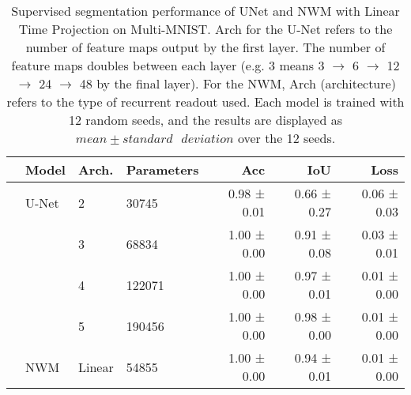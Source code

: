 \begin{table*}[h!]
    \centering
    \begin{tabular}{llllrrr}
    \toprule
        & Model & Arch. & Parameters & Acc & IoU & Loss \\
    \midrule
        & U-Net & 2     & 30745      & 0.98 ± 0.01 & 0.66 ± 0.27 & 0.06 ± 0.03 \\
        &       & 3     & 68834      & 1.00 ± 0.00 & 0.91 ± 0.08 & 0.03 ± 0.01 \\
        &       & 4     & 122071     & 1.00 ± 0.00 & 0.97 ± 0.01 & 0.01 ± 0.00 \\
        &       & 5     & 190456     & 1.00 ± 0.00 & 0.98 ± 0.00 & 0.01 ± 0.00 \\
    \midrule
        & NWM   & Linear & 54855      & 1.00 ± 0.00 & 0.94 ± 0.01 & 0.01 ± 0.00 \\
    \bottomrule
    \end{tabular}
    \caption{Supervised segmentation performance of UNet and NWM with Linear Time Projection on Multi-MNIST. Arch for the U-Net refers to the number of feature maps output by the first layer. The number of feature maps doubles between each layer (e.g. 3 means 3 $\rightarrow$ 6 $\rightarrow$ 12 $\rightarrow$ 24 $\rightarrow$ 48 by the final layer). For the NWM, Arch (architecture) refers to the type of recurrent readout used.
    Each model is trained with 12 random seeds, and the results are displayed as $mean \pm standard \text{ }deviation$ over the 12 seeds.}
    \vspace{-3mm}
    \label{tab:multi-mnist_appendix}
\end{table*}